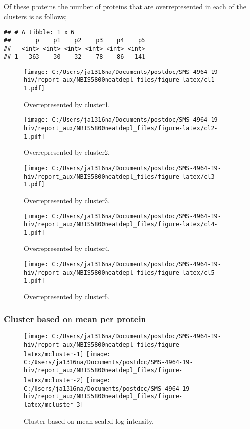 \documentclass[
]{article}
\begin{document}
Of these proteins the number of proteins that are overrepresented in each of the clusters is as follows;

\begin{verbatim}
## # A tibble: 1 x 6
##       p    p1    p2    p3    p4    p5
##   <int> <int> <int> <int> <int> <int>
## 1   363    30    32    78    86   141
\end{verbatim}

\begin{figure}
\centering
\texttt{[image: C:/Users/ja1316na/Documents/postdoc/SMS-4964-19-hiv/report\_aux/NBIS5800neatdepl\_files/figure-latex/cl1-1.pdf]}
\caption{\label{fig:cl1}Overrepresented by cluster1.}
\end{figure}

\begin{figure}
\centering
\texttt{[image: C:/Users/ja1316na/Documents/postdoc/SMS-4964-19-hiv/report\_aux/NBIS5800neatdepl\_files/figure-latex/cl2-1.pdf]}
\caption{\label{fig:cl2}Overrepresented by cluster2.}
\end{figure}

\begin{figure}
\centering
\texttt{[image: C:/Users/ja1316na/Documents/postdoc/SMS-4964-19-hiv/report\_aux/NBIS5800neatdepl\_files/figure-latex/cl3-1.pdf]}
\caption{\label{fig:cl3}Overrepresented by cluster3.}
\end{figure}

\begin{figure}
\centering
\texttt{[image: C:/Users/ja1316na/Documents/postdoc/SMS-4964-19-hiv/report\_aux/NBIS5800neatdepl\_files/figure-latex/cl4-1.pdf]}
\caption{\label{fig:cl4}Overrepresented by cluster4.}
\end{figure}

\begin{figure}
\centering
\texttt{[image: C:/Users/ja1316na/Documents/postdoc/SMS-4964-19-hiv/report\_aux/NBIS5800neatdepl\_files/figure-latex/cl5-1.pdf]}
\caption{\label{fig:cl5}Overrepresented by cluster5.}
\end{figure}

\FloatBarrier

\hypertarget{cluster-based-on-mean-per-protein}{%
\subsubsection{Cluster based on mean per protein}\label{cluster-based-on-mean-per-protein}}

\begin{figure}
\texttt{[image: C:/Users/ja1316na/Documents/postdoc/SMS-4964-19-hiv/report\_aux/NBIS5800neatdepl\_files/figure-latex/mcluster-1]} \texttt{[image: C:/Users/ja1316na/Documents/postdoc/SMS-4964-19-hiv/report\_aux/NBIS5800neatdepl\_files/figure-latex/mcluster-2]} \texttt{[image: C:/Users/ja1316na/Documents/postdoc/SMS-4964-19-hiv/report\_aux/NBIS5800neatdepl\_files/figure-latex/mcluster-3]} \caption{Cluster based on mean scaled log intensity.}\label{fig:mcluster}
\end{figure}
\end{document}
